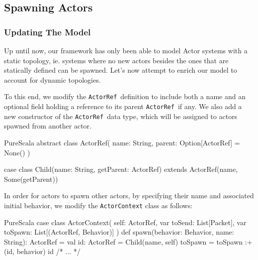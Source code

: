 \documentclass[a4paper,twoside]{article}
\newcommand{\InlineS}[1]{\lstinline[language=PureScala,basicstyle=\small\ttfamily,columns=fixed]|#1|}
\newcommand{\TODO}[1]{\textcolor{YellowOrange}{(TODO: #1)}} %
\newcommand{\ActorRef}{\InlineS{ActorRef}\ }
\newcommand{\stt}[1]{\texttt{\small{#1}}}
\begin{document}
%

%

\subsection{Spawning Actors}
\label{spawn}

\subsubsection{Updating The Model}

Up until now, our framework has only been able to model Actor systems with a static topology, ie. systems where no new actors besides the ones that are statically defined can be spawned. Let's now attempt to enrich our model to account for dynamic topologies.

To this end, we modify the \ActorRef definition to include both a name and an optional field holding a reference to its parent \ActorRef if any. We also add a new constructor of the \ActorRef data type, which will be assigned to actors spawned from another actor.

\begin{ShortCode}{PureScala}
abstract class ActorRef(
  name: String,
  parent: Option[ActorRef] = None()
)

case class Child(name: String, getParent: ActorRef)
  extends ActorRef(name, Some(getParent))
\end{ShortCode}

In order for actors to spawn other actors, by specifying their name and associated 
initial behavior, we modify the \stt{ActorContext} class as follows:

\begin{ShortCode}{PureScala}
case class ActorContext(
  self: ActorRef,
  var toSend: List[Packet],
  var toSpawn: List[(ActorRef, Behavior)]
) {
  def spawn(behavior: Behavior, name: String): ActorRef = {
    val id: ActorRef = Child(name, self)
    toSpawn = toSpawn :+ (id, behavior)
    id
  }
  /* ... */
}
\end{ShortCode}
\end{document}
